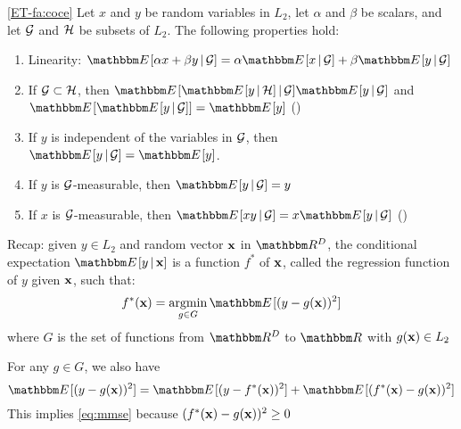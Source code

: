 \begin{frame}
    
    \vspace{2em}
    \Fact\eqref{ET-fa:coce}
    Let $x$ and $y$ be random variables in $L_2$, let $\alpha$ and $\beta$ be
    scalars, and let $\mathcal G$ and $\mathcal H$ be subsets of $L_2$.  The following
    properties hold:
    \begin{enumerate}
        \item Linearity: $\EE[ \alpha x + \beta y \given \gG] 
            = \alpha \EE[ x \given \gG ] + \beta \EE[ y \given \gG]$
        \item If $\mathcal G \subset \mathcal H$, 
                then $\EE[ \EE[ y \given \hH] \given \gG] \EE[ y \given \gG]$ 
                and $\EE[ \EE[ y \given \gG] ] = \EE[y]$ ()
        \item If $y$ is independent of the variables in $\mathcal G$, then $\EE[ y
            \given \gG] = \EE[y]$.
        \item If $y$ is $\mathcal G$-measurable, then $\EE[ y \given \gG] = y$
        \item If $x$ is $\mathcal G$-measurable, then $\EE[ x y \given \gG] = x \EE[y
            \given \gG]$ ()
    \end{enumerate}
    
\end{frame}

\begin{frame}

    \vspace{2em}
    Recap: given $y \in L_2$ and random vector ${\mathbf x}$ in $\RR^D$, the
    conditional expectation $\EE[y \given \boldx]$ is a function $f^*$ of
    ${\mathbf x}$, called the regression function of $y$ given ${\mathbf x}$,
    such that:
    \begin{equation}
        \label{eq:mmse}
        f^*(\boldx) = \argmin_{g \in G} \EE[ (y - g(\boldx))^2 ] 
    \end{equation}
    where $G$ is the set of functions from $\RR^D$ to $\RR$ with $g({\mathbf x}) \in L_2$
    
    \vspace{1em}
    For any $g \in G$, we also have
    \begin{equation}
        \label{eq:ebrf}
        \EE [ (y - g(\boldx))^2 ]
        = \EE [ (y - f^*(\boldx) )^2 ] +  \EE[ (f^*(\boldx) - g(\boldx))^2 ]
    \end{equation}
    This implies \eqref{eq:mmse} because $(f^*({\mathbf x}) - g({\mathbf x}))^2 \geq 0$
    
\end{frame}

